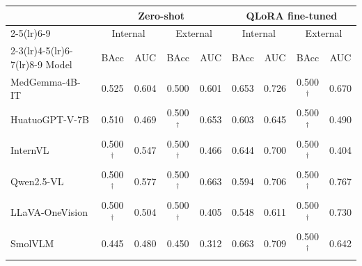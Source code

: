 \begin{tabular}{lcccccccc}
\toprule
& \multicolumn{4}{c}{Zero-shot} & \multicolumn{4}{c}{QLoRA fine-tuned} \\
\cmidrule(lr){2-5}\cmidrule(lr){6-9}
& \multicolumn{2}{c}{Internal} & \multicolumn{2}{c}{External} &
  \multicolumn{2}{c}{Internal} & \multicolumn{2}{c}{External} \\
\cmidrule(lr){2-3}\cmidrule(lr){4-5}\cmidrule(lr){6-7}\cmidrule(lr){8-9}
Model & BAcc & AUC & BAcc & AUC & BAcc & AUC & BAcc & AUC \\
\midrule
MedGemma-4B-IT & 0.525 & 0.604 & 0.500 & 0.601 & 0.653 & 0.726 & 0.500$^{\dagger}$ & 0.670 \\
HuatuoGPT-V-7B & 0.510 & 0.469 & 0.500$^{\dagger}$ & 0.653 & 0.603 & 0.645 & 0.500$^{\dagger}$ & 0.490 \\
InternVL & 0.500$^{\dagger}$ & 0.547 & 0.500$^{\dagger}$ & 0.466 & 0.644 & 0.700 & 0.500$^{\dagger}$ & 0.404 \\
Qwen2.5-VL & 0.500$^{\dagger}$ & 0.577 & 0.500$^{\dagger}$ & 0.663 & 0.594 & 0.706 & 0.500$^{\dagger}$ & 0.767 \\
LLaVA-OneVision & 0.500$^{\dagger}$ & 0.504 & 0.500$^{\dagger}$ & 0.405 & 0.548 & 0.611 & 0.500$^{\dagger}$ & 0.730 \\
SmolVLM & 0.445 & 0.480 & 0.450 & 0.312 & 0.663 & 0.709 & 0.500$^{\dagger}$ & 0.642 \\
\bottomrule
\end{tabular}
